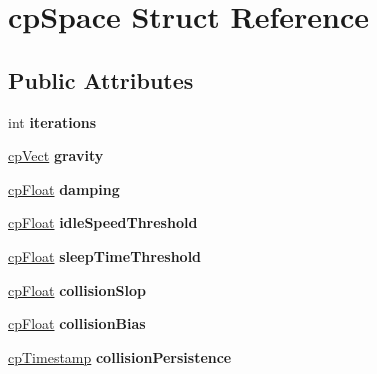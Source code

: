 \hypertarget{structcp_space}{}\section{cp\+Space Struct Reference}
\label{structcp_space}
\subsection*{Public Attributes}
\begin{DoxyCompactItemize}
\item 
\mbox{\label{structcp_space_af278fb3ab6ec903acd2fe49ee821fcf8}} 
int {\bfseries iterations}
\item 
\mbox{\label{structcp_space_a93479d52c441a2e3b36716d9a9d55852}} 
\mbox{\hyperlink{structcp_vect}{cp\+Vect}} {\bfseries gravity}
\item 
\mbox{\label{structcp_space_a421f86b111318e2eced602c6930fffaa}} 
\mbox{\hyperlink{group__basic_types_gac1ed65573e035bf892505768c852d8d3}{cp\+Float}} {\bfseries damping}
\item 
\mbox{\label{structcp_space_a88ffce371610f2b94997160de703f1cd}} 
\mbox{\hyperlink{group__basic_types_gac1ed65573e035bf892505768c852d8d3}{cp\+Float}} {\bfseries idle\+Speed\+Threshold}
\item 
\mbox{\label{structcp_space_a928d74741904aae266a9efff5b5f68f7}} 
\mbox{\hyperlink{group__basic_types_gac1ed65573e035bf892505768c852d8d3}{cp\+Float}} {\bfseries sleep\+Time\+Threshold}
\item 
\mbox{\label{structcp_space_af1bec644a24e12bfc642a942a88520f7}} 
\mbox{\hyperlink{group__basic_types_gac1ed65573e035bf892505768c852d8d3}{cp\+Float}} {\bfseries collision\+Slop}
\item 
\mbox{\label{structcp_space_a8f5a7d2a5cf25b1f18d05e9b31a87ad9}} 
\mbox{\hyperlink{group__basic_types_gac1ed65573e035bf892505768c852d8d3}{cp\+Float}} {\bfseries collision\+Bias}
\item 
\mbox{\label{structcp_space_a3bd0012d98c276bd903b1635b9756396}} 
\mbox{\hyperlink{group__basic_types_gaa24652c104082d0725066ea5ac7dc83f}{cp\+Timestamp}} {\bfseries collision\+Persistence}

\end{DoxyCompactItemize}

